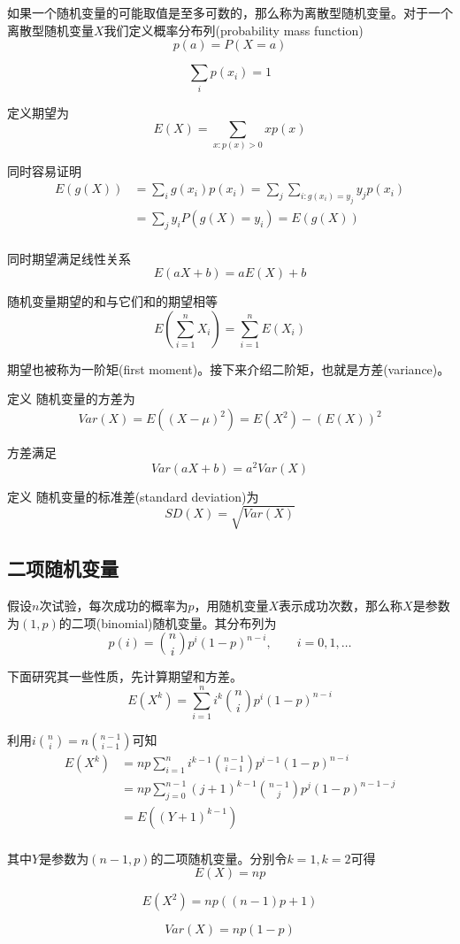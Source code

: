 \documentclass[UTF8]{ctexart}
\begin{document}
如果一个随机变量的可能取值是至多可数的，那么称为离散型随机变量。对于一个离散型随机变量$X$我们定义概率分布列(probability mass function)
$$p(a)=P(X=a)$$

$$\sum_{i}p(x_{i})=1$$

定义期望为
$$E(X)=\sum_{x:p(x)>0}xp(x) $$

同时容易证明
$$\begin{aligned}
E(g(X))&=\sum_{i}g(x_{i})p(x_{i})=\sum_{j} \sum_{i:g(x_{i})=y_{j}}y_{j}p(x_{i})\\
&=\sum_{j}y_{i}P(g(X)=y_{i})=E(g(X))\\
\end{aligned}$$

同时期望满足线性关系
$$E(aX+b)=aE(X)+b$$

随机变量期望的和与它们和的期望相等
$$E(\sum_{i=1}^{n}X_{i})=\sum_{i=1}^{n}E(X_{i})$$

期望也被称为一阶矩(first moment)。接下来介绍二阶矩，也就是方差(variance)。

定义 随机变量的方差为
$$Var(X)=E((X-\mu )^{2})=E(X^{2})-(E(X))^{2}$$

方差满足
$$Var(aX+b)=a^{2}Var(X)$$

定义 随机变量的标准差(standard deviation)为
$$SD(X)=\sqrt{Var(X)} $$

\subsection{二项随机变量}

假设$n$次试验，每次成功的概率为$p$，用随机变量$X$表示成功次数，那么称$X$是参数为$(1,p)$的二项(binomial)随机变量。其分布列为
$$p(i)=\binom{n}{i} p^{i}(1-p)^{n-i} ,\qquad i=0,1,\ldots $$

下面研究其一些性质，先计算期望和方差。
$$E(X^{k})=\sum_{i=1}^{n}i^{k}\binom{n}{i}p^{i}(1-p)^{n-i} $$

利用$i\binom{n}{i}=n\binom{n-1}{i-1} $可知
$$\begin{aligned}
E(X^{k})&=np\sum_{i=1}^{n}i^{k-1}\binom{n-1}{i-1}p^{i-1}(1-p)^{n-i}\\
&=np\sum_{j=0}^{n-1}(j+1)^{k-1}\binom{n-1}{j}p^{j}(1-p)^{n-1-j}\\
&=E((Y+1)^{k-1})\\
\end{aligned} $$

其中$Y$是参数为$(n-1,p)$的二项随机变量。分别令$k=1,k=2$可得
$$E(X)=np$$

$$E(X^{2})=np((n-1)p+1)$$

$$Var(X)=np(1-p)$$
\end{document}
